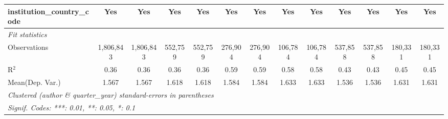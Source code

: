 \begin{tabular}{lcccccccccccc}
   institution\_country\_code               & Yes            & Yes          & Yes            & Yes          & Yes           & Yes            & Yes            & Yes           & Yes            & Yes            & Yes            & Yes\\  
   \midrule
   \emph{Fit statistics}\\
   Observations                             & 1,806,843      & 1,806,843    & 552,759        & 552,759      & 276,904       & 276,904        & 106,784        & 106,784       & 537,858        & 537,858        & 180,331        & 180,331\\  
   R$^2$                                    & 0.36           & 0.36         & 0.36           & 0.36         & 0.59          & 0.59           & 0.58           & 0.58          & 0.43           & 0.43           & 0.45           & 0.45\\  
Mean(Dep. Var.) & 1.567 & 1.567 & 1.618 & 1.618 & 1.584 & 1.584 & 1.633 & 1.633 & 1.536 & 1.536 & 1.631 & 1.631 \\
   \midrule \midrule
   \multicolumn{13}{l}{\emph{Clustered (author \& quarter\_year) standard-errors in parentheses}}\\
   \multicolumn{13}{l}{\emph{Signif. Codes: ***: 0.01, **: 0.05, *: 0.1}}\\
\end{tabular}
\par\endgroup
